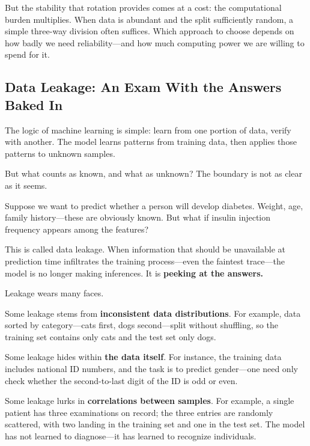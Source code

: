 But the stability that rotation provides comes at a cost: the computational burden multiplies. When data is abundant and the split sufficiently random, a simple three-way division often suffices. Which approach to choose depends on how badly we need reliability---and how much computing power we are willing to spend for it.

\newpage
\subsection{Data Leakage: An Exam With the Answers Baked In}

The logic of machine learning is simple: learn from one portion of data, verify with another.
The model learns patterns from training data, then applies those patterns to unknown samples.

But what counts as known, and what as unknown? The boundary is not as clear as it seems.

\vspace{1em}

Suppose we want to predict whether a person will develop diabetes. Weight, age, family history---these are obviously known. But what if insulin injection frequency appears among the features?

This is called data leakage. When information that should be unavailable at prediction time infiltrates the training process---even the faintest trace---the model is no longer making inferences. It is \textbf{peeking at the answers.}

\vspace{1em}

Leakage wears many faces.

Some leakage stems from \textbf{inconsistent data distributions}. For example, data sorted by category---cats first, dogs second---split without shuffling, so the training set contains only cats and the test set only dogs.

Some leakage hides within \textbf{the data itself}. For instance, the training data includes national ID numbers, and the task is to predict gender---one need only check whether the second-to-last digit of the ID is odd or even.

Some leakage lurks in \textbf{correlations between samples}. For example, a single patient has three examinations on record; the three entries are randomly scattered, with two landing in the training set and one in the test set. The model has not learned to diagnose---it has learned to recognize individuals.

